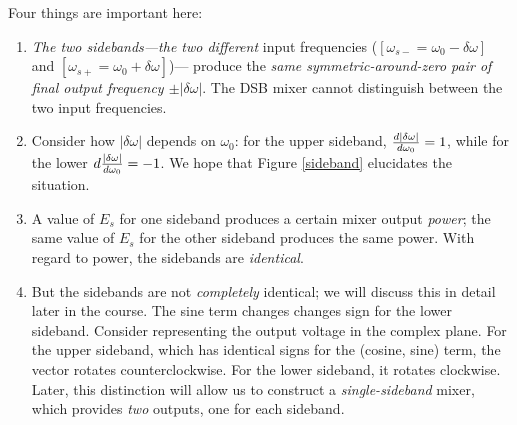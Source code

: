 \documentclass[11pt,preprint]{aastex}
\begin{document}
        Four things are important here: \begin{enumerate}

        \item {\it The two sidebands---the two different} input
frequencies ($[\omega_{s-}= \omega_0 - \delta \omega]$ and $[\omega_{s+}=
\omega_0 + \delta \omega]$)--- produce the {\it same
symmetric-around-zero pair of final output frequency $\pm |\delta
\omega|$}. The DSB mixer
cannot distinguish between the two input frequencies.

        \item Consider how $|\delta \omega|$ depends on $\omega_0$: for
the upper sideband, ${d |\delta \omega| \over d\omega_0} = 1$, while for
the lower $d {|\delta \omega| \over d\omega_0} = -1$. We hope that
Figure
\ref{sideband} elucidates the
situation.

        \item A value of $E_s$ for one sideband produces a certain mixer
output {\it power}; the same value of $E_s$ for the other sideband
produces the same power. With regard to power, the sidebands are {\it
identical}.

        \item But the sidebands are not {\it completely} identical; we
	  will discuss this in detail later in the course. The sine term
	  changes changes sign for the lower sideband. Consider
	  representing the output voltage in the complex plane. For the
	  upper sideband, which has identical signs for the (cosine,
	  sine) term, the vector rotates counterclockwise. For the lower
	  sideband, it rotates clockwise. Later, this distinction will
	  allow us to construct a {\it single-sideband} mixer, which
	  provides {\it two} outputs, one for each sideband.

\end{enumerate}
\end{document}
